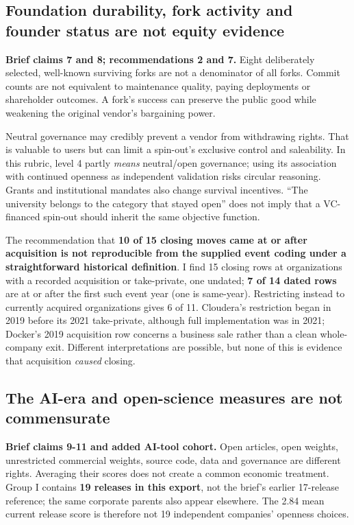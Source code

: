 \documentclass{article}
\begin{document}
\subsection{Foundation durability, fork activity and founder status are
not equity
evidence}\label{foundation-durability-fork-activity-and-founder-status-are-not-equity-evidence}

\textbf{Brief claims 7 and 8; recommendations 2 and 7.} Eight
deliberately selected, well-known surviving forks are not a denominator
of all forks. Commit counts are not equivalent to maintenance quality,
paying deployments or shareholder outcomes. A fork's success can
preserve the public good while weakening the original vendor's
bargaining power.

Neutral governance may credibly prevent a vendor from withdrawing
rights. That is valuable to users but can limit a spin-out's exclusive
control and saleability. In this rubric, level 4 partly \emph{means}
neutral/open governance; using its association with continued openness
as independent validation risks circular reasoning. Grants and
institutional mandates also change survival incentives. ``The university
belongs to the category that stayed open'' does not imply that a
VC-financed spin-out should inherit the same objective function.

The recommendation that \textbf{10 of 15 closing moves came at or after
acquisition is not reproducible from the supplied event coding under a
straightforward historical definition}. I find 15 closing rows at
organizations with a recorded acquisition or take-private, one undated;
\textbf{7 of 14 dated rows} are at or after the first such event year
(one is same-year). Restricting instead to currently acquired
organizations gives 6 of 11. Cloudera's restriction began in 2019 before
its 2021 take-private, although full implementation was in 2021;
Docker's 2019 acquisition row concerns a business sale rather than a
clean whole-company exit. Different interpretations are possible, but
none of this is evidence that acquisition \emph{caused} closing.
\citep{InputData}

\subsection{The AI-era and open-science measures are not
commensurate}\label{the-ai-era-and-open-science-measures-are-not-commensurate}

\textbf{Brief claims 9-11 and added AI-tool cohort.} Open articles, open
weights, unrestricted commercial weights, source code, data and
governance are different rights. Averaging their scores does not create
a common economic treatment. Group I contains \textbf{19 releases in
this export}, not the brief's earlier 17-release reference; the same
corporate parents also appear elsewhere. The 2.84 mean current release
score is therefore not 19 independent companies' openness choices.
\end{document}
